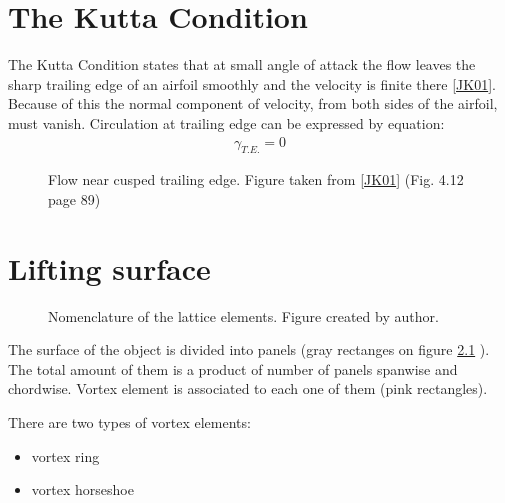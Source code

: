 \documentclass[a4paper,12pt,english]{jupyterBook}
\let\sphinxpxdimen\pdfpxdimen\else\newdimen\sphinxpxdimen
\begin{document}
\chapter{The Kutta Condition}
\label{\detokenize{chapters/description/theory:the-kutta-condition}}
\sphinxAtStartPar
The Kutta Condition states that at small angle of attack the flow leaves the sharp trailing edge of an airfoil smoothly and the velocity is finite there {[}\hyperlink{cite.chapters/bibliography:id4}{JK01}{]}. Because of this the normal component of velocity, from both sides of the airfoil, must vanish. Circulation at trailing edge can be expressed by equation:
\begin{equation*}
\begin{split}
\gamma_{T.E.}=0
\end{split}
\end{equation*}
\begin{figure}[htbp]
\centering
\capstart

\noindent{}
\caption{Flow near cusped trailing edge. Figure taken from {[}\hyperlink{cite.chapters/bibliography:id4}{JK01}{]} (Fig. 4.12 page 89)}\label{\detokenize{chapters/description/theory:kutta}}\end{figure}


\chapter{Lifting surface}
\label{\detokenize{chapters/description/theory:lifting-surface}}
\begin{figure}[htbp]
\centering
\capstart

\noindent\sphinxincludegraphics[height=300\sphinxpxdimen]{{siatka}.png}
\caption{Nomenclature of the lattice elements. Figure created by author.}\label{\detokenize{chapters/description/theory:siatka}}\end{figure}

\sphinxAtStartPar
The surface of the object is divided into panels (gray rectanges on figure \hyperref[\detokenize{chapters/description/theory:siatka}]{\ref{\detokenize{chapters/description/theory:siatka}}} ). The total amount of them is a product of number of panels spanwise and chordwise. Vortex element is associated to each one of them (pink rectangles).

\sphinxAtStartPar
There are two types of vortex elements:
\begin{itemize}
\item {} 
\sphinxAtStartPar
vortex ring

\item {} 
\sphinxAtStartPar
vortex horseshoe

\end{itemize}
\end{document}
